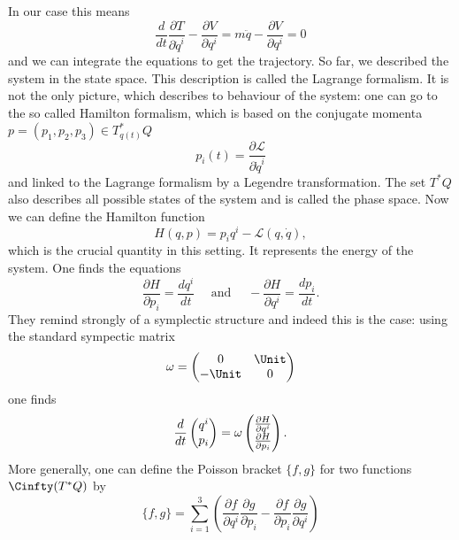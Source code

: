 In our case this means
\begin{equation*}
	\frac{d}{dt} 
	\frac{\partial T}{\partial \dot q^i}
	-
	\frac{\partial V}{\partial q^i}
	=
	m \ddot q
	-
	\frac{\partial V}{\partial q^i}
	=
	0
\end{equation*}
and we can integrate the equations to get the trajectory. So far, we described 
the system in the state space. This description is called 
the Lagrange formalism. It is not the only picture, which describes to 
behaviour of the system: one can go to the so called Hamilton formalism, which 
is based on the conjugate momenta $p = (p_1, p_2, p_3) \in T_{q(t)}^*Q$
\begin{equation*}
	p_i(t)
	=
	\frac{\partial \mathcal{L}}{\partial \dot q^i}
\end{equation*}
and linked to the Lagrange formalism by a Legendre transformation. The set $T^*Q$ 
also describes all possible states of the system and is called the phase space. 
Now we can define the Hamilton function
\begin{equation*}
	H(q, p)
	=
	p_i q^i
	-
	\mathcal{L}(q, \dot q),
\end{equation*} 
which is the crucial quantity in this setting. It represents the energy of the 
system. One finds the equations
\begin{equation*}
	\frac{\partial H}{\partial p_i}
	=
	\frac{d q^i}{dt}
	\quad \text{ and } \quad
	- \frac{\partial H}{\partial q^i}
	=
	\frac{d p_i}{dt}.
\end{equation*}
They remind strongly of a symplectic structure and indeed this is the case: 
using the standard sympectic matrix
\begin{equation*}
	\omega
	=
	\begin{pmatrix}
		0 & \Unit
		\\
		- \Unit & 0
	\end{pmatrix}
\end{equation*}
one finds
\begin{equation*}
	\frac{d}{dt} \begin{pmatrix} q^i \\ p_i \end{pmatrix}
	=
	\omega
	\begin{pmatrix} \frac{\partial H}{\partial q^i} \\ \frac{\partial H}{\partial p_i} \end{pmatrix}.
\end{equation*}
More generally, one can define the Poisson bracket $\{f, g\}$ for two functions 
$\Cinfty(T^*Q)$ by
\begin{equation*}
	\{f, g\}
	=
	\sum\limits_{i=1}^3
	\left(
		\frac{\partial f}{\partial q^i}
		\frac{\partial g}{\partial p_i}
		-
		\frac{\partial f}{\partial p_i}
		\frac{\partial g}{\partial q^i}
	\right)
\end{equation*}

